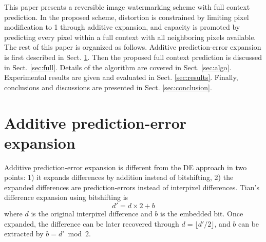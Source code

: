 \documentclass{article}
\begin{document}
This paper presents a reversible image watermarking scheme with full context prediction. In the
proposed scheme, distortion is constrained by limiting pixel modification to 1 through additive
expansion, and capacity is promoted by predicting every pixel within a full context with all
neighboring pixels available. The rest of this paper is organized as follows. Additive
prediction-error expansion is first described in Sect. \ref{sec:pee}. Then the proposed full context
prediction is discussed in Sect. \ref{sec:full}. Details of the algorithm are covered in Sect.
\ref{sec:algo}. Experimental results are given and evaluated in Sect. \ref{sec:results}. Finally,
conclusions and discussions are presented in Sect. \ref{sec:conclusion}.

\section{Additive prediction-error expansion} \label{sec:pee}
Additive prediction-error expansion is different from the DE approach \cite{Tian03de} in two points:
1) it expands differences by addition instead of bitshifting, 2) the expanded differences are
prediction-errors instead of interpixel differences. Tian's difference expansion using bitshifting
is 
\begin{equation}
  d' = d \times 2 + b
\end{equation}
where $d$ is the original interpixel difference and $b$ is the embedded bit. Once expanded, the
difference can be later recovered through $d = \lfloor d'/2 \rfloor$, and $b$ can be extracted by $b
= d' \bmod 2$.
\end{document}
